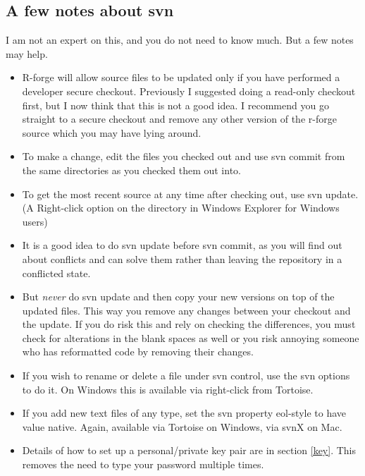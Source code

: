 \documentclass[12pt, a4paper]{article}
\renewcommand{\=}{\,=\,}
\newcommand{\+}{\,+\,}
\begin{document}
\subsection{A few notes about svn}
I am not an expert on this, and you do not need to know much. But a few notes
may help.
\begin{itemize}
\item R-forge will allow source files to be updated only if you have performed a
  developer secure checkout. Previously I suggested doing a read-only checkout
  first, but I now think that this is not a good idea. I recommend you go
  straight to a secure checkout and remove any other version of the r-forge
  source which you may have lying around.
 \item To make a change, edit the files you checked out and use \textsf{svn
     commit} from the same directories as you checked them out into.
 \item To get the most recent source at any time after checking out, use
   \textsf{svn update}. (A Right-click option on the directory in Windows
   Explorer for Windows users)
\item It is a good idea to do \textsf{svn update} before \textsf{svn commit}, as
  you will find out about conflicts and can solve them rather than leaving the
  repository in a conflicted state.
\item But \emph{never} do \textsf{svn update} and then copy your new versions on
  top of the updated files. This way you remove any changes between your
  checkout and the update. If you do risk this and rely on checking the
  differences, you must check for alterations in the blank spaces as well or you
  risk annoying someone who has reformatted code by removing their changes.
\item If you wish to rename or delete a file under svn control, use the svn
  options to do it. On Windows this is available via right-click from Tortoise.
\item If you add new text files of any type, set the svn property
  \textsf{eol-style} to have value \textsf{native}.  Again, available via
  Tortoise on Windows, via svnX on Mac.
\item Details of how to set up a personal/private key pair are in section
  \ref{key}. This removes the need to type your password multiple times.
\end{itemize}
\end{document}
